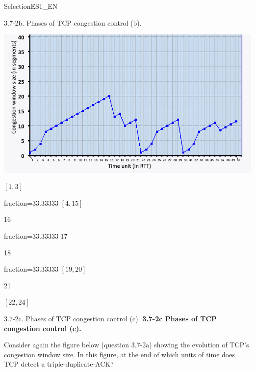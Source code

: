 \documentclass[a4paper]{article}
\begin{document}
\begin{quiz}{SelectionES1\_EN}
\begin{multi}[points=1,shuffle,multiple]{3.7-2b. Phases of TCP congestion control (b).}
\begin{center}
	\includegraphics[width=\linewidth]{figs/tcp_cc_evolution.jpg}
\end{center}
\item $[1,3]$
\item[fraction=33.33333] $[4,15]$
\item 16
\item[fraction=33.33333] 17
\item 18
\item[fraction=33.33333] $[19,20]$
\item 21
\item $[22,24]$
\end{multi}

\begin{multi}[points=1,shuffle,multiple]{3.7-2c. Phases of TCP congestion control (c).}
\textbf{3.7-2c Phases of TCP congestion control (c).} 

Consider again the figure below (question 3.7-2a) showing the evolution of TCP's congestion window size. In this figure, at the end of which units of time does TCP detect a triple-duplicate-ACK?


\end{multi}
\end{quiz}
\end{document}
